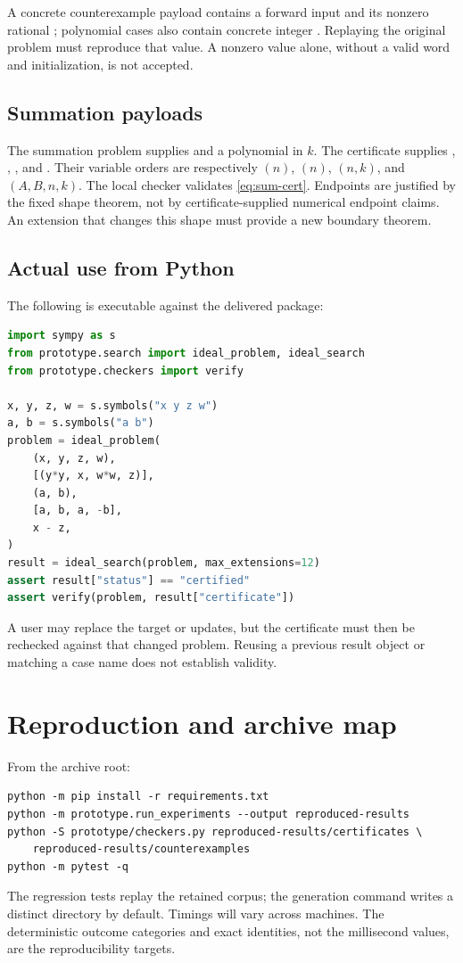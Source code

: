 A concrete counterexample payload contains a forward input  and its
nonzero rational ; polynomial cases also contain concrete integer
. Replaying the original problem must reproduce that value.
A nonzero value alone, without a valid word and initialization, is not accepted.

\subsection{Summation payloads}

The summation problem supplies  and a polynomial  in
$k$. The certificate supplies , , , and
. Their variable orders are respectively $(n)$,
$(n)$, $(n,k)$, and $(A,B,n,k)$. The local checker validates
\eqref{eq:sum-cert}. Endpoints are justified by the fixed shape theorem, not by
certificate-supplied numerical endpoint claims. An extension that changes this
shape must provide a new boundary theorem.

\subsection{Actual use from Python}

The following is executable against the delivered package:
\begin{lstlisting}[language=Python]
import sympy as s
from prototype.search import ideal_problem, ideal_search
from prototype.checkers import verify

x, y, z, w = s.symbols("x y z w")
a, b = s.symbols("a b")
problem = ideal_problem(
    (x, y, z, w),
    [(y*y, x, w*w, z)],
    (a, b),
    [a, b, a, -b],
    x - z,
)
result = ideal_search(problem, max_extensions=12)
assert result["status"] == "certified"
assert verify(problem, result["certificate"])
\end{lstlisting}

A user may replace the target or updates, but the certificate must then be
rechecked against that changed problem. Reusing a previous result object or
matching a case name does not establish validity.

\section{Reproduction and archive map}

From the archive root:
\begin{lstlisting}
python -m pip install -r requirements.txt
python -m prototype.run_experiments --output reproduced-results
python -S prototype/checkers.py reproduced-results/certificates \
    reproduced-results/counterexamples
python -m pytest -q
\end{lstlisting}
The regression tests replay the retained  corpus; the generation
command writes a distinct directory by default. Timings will vary across
machines. The deterministic outcome categories and exact identities, not the
millisecond values, are the reproducibility targets.

